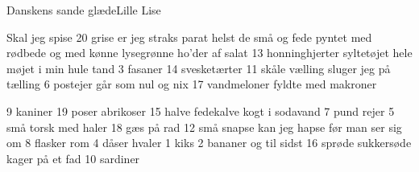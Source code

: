 \begin{sang}{Danskens sande glæde}{Lille Lise}
\begin{vers}
Skal jeg spise
20 grise
er jeg straks parat
helst de små og fede
pyntet med rødbede
og med kønne
lysegrønne
ho'der af salat
13 honninghjerter
syltetøjet
hele møjet
i min hule tand
3 fasaner
14 svesketærter
11 skåle vælling
sluger jeg på  tælling
6 postejer
går som nul og nix
17 vandmeloner
fyldte med makroner
\end{vers}
\vbox{}\vfill
\begin{vers}
9 kaniner
19 poser
abrikoser
15 halve
fedekalve
kogt i sodavand
7 pund rejer
5 små torsk med haler
18 gæs på rad
12 små snapse
kan jeg hapse
før man ser sig om
8 flasker rom
4 dåser hvaler
1 kiks
2 bananer
og til sidst
16 sprøde
sukkersøde
kager på et fad
10 sardiner
\end{vers}
\laps
\end{sang}